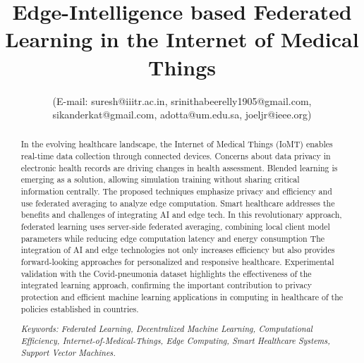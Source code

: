 \documentclass[conference]{IEEEtran}
\begin{document}
\title{Edge-Intelligence based Federated Learning in the Internet of Medical Things}
\author{	
\vspace{0.1in}
(E-mail: suresh@iiitr.ac.in, srinithabeerelly1905@gmail.com,  sikanderkat@gmail.com, adotta@um.edu.sa, joeljr@ieee.org) }

\maketitle

\begin{abstract}
In the evolving healthcare landscape, the Internet of Medical Things (IoMT) enables real-time data collection through connected devices. Concerns about data privacy in electronic health records are driving changes in health assessment. Blended learning is emerging as a solution, allowing simulation training without sharing critical information centrally. The proposed techniques emphasize privacy and efficiency and use federated averaging to analyze edge computation. Smart healthcare addresses the benefits and challenges of integrating AI and edge tech. In this revolutionary approach, federated learning uses server-side federated averaging, combining local client model parameters while reducing edge computation latency and energy consumption The integration of AI and edge technologies not only increases efficiency but also provides forward-looking approaches for personalized and responsive healthcare. Experimental validation with the Covid-pneumonia dataset highlights the effectiveness of the integrated learning approach, confirming the important contribution to privacy protection and efficient machine learning applications in computing in healthcare of the policies established in countries.

\textit{Keywords: Federated Learning, Decentralized Machine Learning, Computational Efficiency, Internet-of-Medical-Things, Edge Computing, Smart Healthcare Systems, Support Vector Machines.}


\end{abstract}
\end{document}
